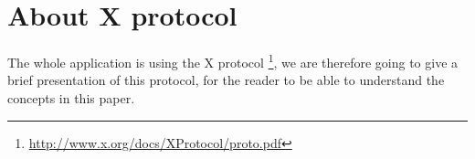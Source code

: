 \chapter{About X protocol}
The whole application is using the X protocol
\footnote{\url{http://www.x.org/docs/XProtocol/proto.pdf}}, 
we are therefore going to give a brief presentation of this protocol, 
for the reader to be able to understand the concepts in this paper.
%

%

%

%

%

